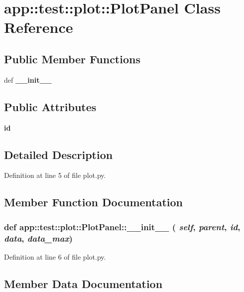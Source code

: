 \section{app::test::plot::PlotPanel Class Reference}
\label{classapp_1_1test_1_1plot_1_1PlotPanel}
\subsection*{Public Member Functions}
\begin{CompactItemize}
\item 
def {\bf \_\-\_\-init\_\-\_\-}
\end{CompactItemize}
\subsection*{Public Attributes}
\begin{CompactItemize}
\item 
{\bf id}
\end{CompactItemize}


\subsection{Detailed Description}


Definition at line 5 of file plot.py.

\subsection{Member Function Documentation}
\subsubsection{\setlength{\rightskip}{0pt plus 5cm}def app::test::plot::PlotPanel::\_\-\_\-init\_\-\_\- ( {\em self},  {\em parent},  {\em id},  {\em data},  {\em data\_\-max})}\label{classapp_1_1test_1_1plot_1_1PlotPanel_4fe9ace98a906c51fc6df5e506b8716b}




Definition at line 6 of file plot.py.

\subsection{Member Data Documentation}
